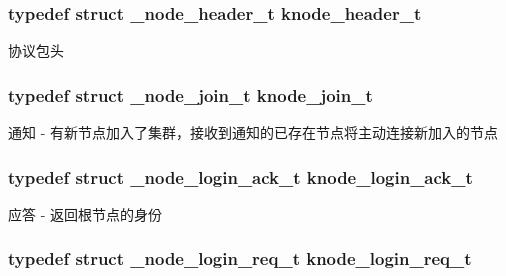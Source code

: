 \subsubsection[{knode\+\_\+header\+\_\+t}]{\setlength{\rightskip}{0pt plus 5cm}typedef struct {\bf \+\_\+node\+\_\+header\+\_\+t}  {\bf knode\+\_\+header\+\_\+t}}\label{a00101_a8624d982efa4afd872ffe22695031845_a8624d982efa4afd872ffe22695031845}


协议包头 

\hypertarget{a00101_af3703e322cb7baa966d39c30d84e76c5_af3703e322cb7baa966d39c30d84e76c5}{}
\subsubsection[{knode\+\_\+join\+\_\+t}]{\setlength{\rightskip}{0pt plus 5cm}typedef struct {\bf \+\_\+node\+\_\+join\+\_\+t}  {\bf knode\+\_\+join\+\_\+t}}\label{a00101_af3703e322cb7baa966d39c30d84e76c5_af3703e322cb7baa966d39c30d84e76c5}


通知 -\/ 有新节点加入了集群，接收到通知的已存在节点将主动连接新加入的节点 

\hypertarget{a00101_a22a0f0b9dd70f9ffcaa7488e06b3ffca_a22a0f0b9dd70f9ffcaa7488e06b3ffca}{}
\subsubsection[{knode\+\_\+login\+\_\+ack\+\_\+t}]{\setlength{\rightskip}{0pt plus 5cm}typedef struct {\bf \+\_\+node\+\_\+login\+\_\+ack\+\_\+t}  {\bf knode\+\_\+login\+\_\+ack\+\_\+t}}\label{a00101_a22a0f0b9dd70f9ffcaa7488e06b3ffca_a22a0f0b9dd70f9ffcaa7488e06b3ffca}


应答 -\/ 返回根节点的身份 

\hypertarget{a00101_aaa9a7ac2f4b54f05d920eb26f6a2743b_aaa9a7ac2f4b54f05d920eb26f6a2743b}{}
\subsubsection[{knode\+\_\+login\+\_\+req\+\_\+t}]{\setlength{\rightskip}{0pt plus 5cm}typedef struct {\bf \+\_\+node\+\_\+login\+\_\+req\+\_\+t}  {\bf knode\+\_\+login\+\_\+req\+\_\+t}}\label{a00101_aaa9a7ac2f4b54f05d920eb26f6a2743b_aaa9a7ac2f4b54f05d920eb26f6a2743b}


